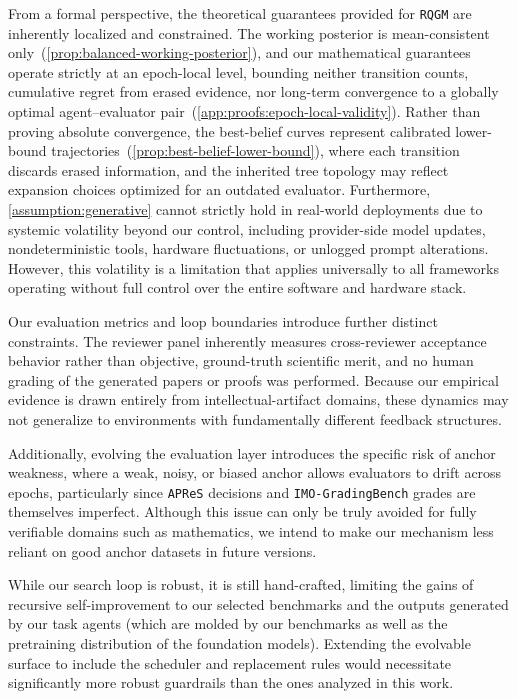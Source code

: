\documentclass{paper}
\newcommand{\ourmethod}{\texttt{RQGM}\xspace}
\newcommand{\apres}{\texttt{APReS}\xspace}
\newcommand{\imogradbench}{\texttt{IMO-GradingBench}\xspace}
\begin{document}
From a formal perspective, the theoretical guarantees provided for \ourmethod are inherently localized and constrained. The working posterior is mean-consistent only~(\cref{prop:balanced-working-posterior}), and our mathematical guarantees operate strictly at an epoch-local level, bounding neither transition counts, cumulative regret from erased evidence, nor long-term convergence to a globally optimal agent--evaluator pair~(\cref{app:proofs:epoch-local-validity}). Rather than proving absolute convergence, the best-belief curves represent calibrated lower-bound trajectories~(\cref{prop:best-belief-lower-bound}), where each transition discards erased information, and the inherited tree topology may reflect expansion choices optimized for an outdated evaluator. Furthermore, \cref{assumption:generative} cannot strictly hold in real-world deployments due to systemic volatility beyond our control, including provider-side model updates, nondeterministic tools, hardware fluctuations, or unlogged prompt alterations. However, this volatility is a limitation that applies universally to all frameworks operating without full control over the entire software and hardware stack.

Our evaluation metrics and loop boundaries introduce further distinct constraints. The reviewer panel inherently measures cross-reviewer acceptance behavior rather than objective, ground-truth scientific merit, and no human grading of the generated papers or proofs was performed. Because our empirical evidence is drawn entirely from intellectual-artifact domains, these dynamics may not generalize to environments with fundamentally different feedback structures.

Additionally, evolving the evaluation layer introduces the specific risk of anchor weakness, where a weak, noisy, or biased anchor allows evaluators to drift across epochs, particularly since \apres decisions and \imogradbench grades are themselves imperfect. Although this issue can only be truly avoided for fully verifiable domains such as mathematics, we intend to make our mechanism less reliant on good anchor datasets in future versions.  

While our search loop is robust, it is still hand-crafted, limiting the gains of recursive self-improvement to our selected benchmarks and the outputs generated by our task agents (which are molded by our benchmarks as well as the pretraining distribution of the foundation models). Extending the evolvable surface to include the scheduler and replacement rules would necessitate significantly more robust guardrails than the ones analyzed in this work. 
\end{document}
